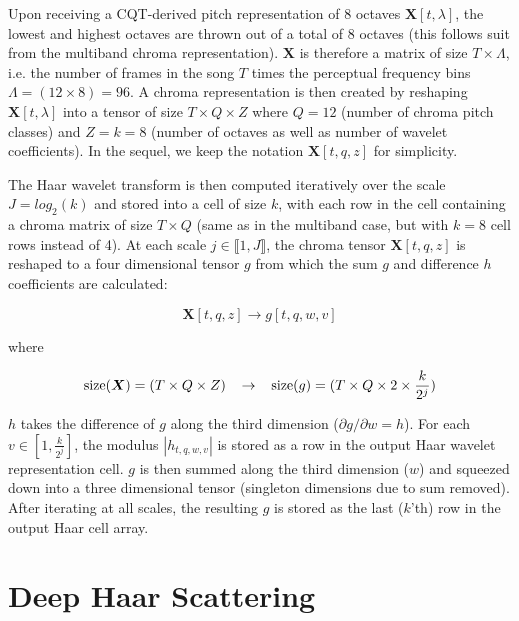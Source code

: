 \documentclass{article}
\makeatletter
\newcommand*{\ie}{i.e.\@\xspace}
\makeatother
\begin{document}
	Upon receiving a CQT-derived pitch representation of 8 octaves $\boldsymbol{X}[t,\lambda]$, the lowest and highest octaves are thrown out of a total of 8 octaves (this follows suit from the multiband chroma representation).
$\boldsymbol{X}$ is therefore a matrix of size $T \times \Lambda$, \ie the number of frames in the song $T$ times the perceptual frequency bins $\Lambda = (12 \times 8) = 96$.
A chroma representation is then created by reshaping $\boldsymbol{X}[t, \lambda]$ into a tensor of size $T \times Q \times Z$ where $Q = 12$ (number of chroma pitch classes) and $Z = k = 8$ (number of octaves as well as number of wavelet coefficients).
In the sequel, we keep the notation $\boldsymbol{X}[t, q, z]$ for simplicity.
	
	The Haar wavelet transform is then computed iteratively over the scale $J  = log_2(k)$ and stored into a cell of size $k$, with each row in the cell containing a chroma matrix of size $T \times Q$ (same as in the multiband case, but with $k=8$ cell rows instead of 4). At each scale $j \in \llbracket1, J\rrbracket$, the chroma tensor $\boldsymbol{X}[t,q,z]$ is reshaped to a four dimensional tensor $g$ from which the sum $g$ and difference $h$ coefficients are calculated:
	
	\begin{equation}
	\boldsymbol{X}[t,q,z] \rightarrow g[t,q,w,v]
	\end{equation}
	
	where
	
	\begin{equation}
	\mathrm{size}(\boldsymbol{X}) = (T \times Q \times Z) \hspace{0.3cm} \rightarrow \hspace{0.3cm}  \mathrm{size}(g) = (T \times Q \times 2 \times \frac{k}{2^j})
	\end{equation}
	
	$h$ takes the difference of $g$ along the third dimension ($\partial g/\partial w = h$). For each $v \in [1, \frac{k}{2^j}]$, the modulus $| h_{t,q,w,v}|$ is stored as a row in the output Haar wavelet representation cell. $g$ is then summed along the third dimension ($w$) and squeezed down into a three dimensional tensor (singleton dimensions due to sum removed). After iterating at all scales, the resulting $g$ is stored as the last ($k$'th) row in the output Haar cell array.
	

\section{Deep Haar Scattering}\label{sec:scattering}
\end{document}

